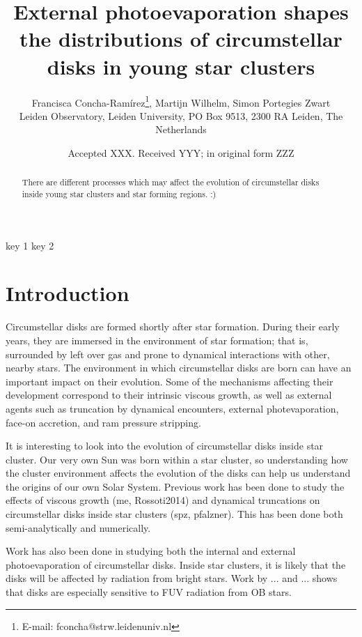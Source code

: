 \documentclass[fleqn,usenatbib]{mnras}
\title[External photoevaporation of disks in young star clusters]{External photoevaporation shapes the distributions of circumstellar disks in young star clusters}
\author[Concha-Ramírez et al.]{
Francisca Concha-Ramírez\thanks{E-mail: fconcha@strw.leidenuniv.nl},
Martijn Wilhelm,
Simon Portegies Zwart
\\
Leiden Observatory, Leiden University, PO Box 9513, 2300 RA Leiden, The Netherlands\\
}
\date{Accepted XXX. Received YYY; in original form ZZZ}
\begin{document}
\label{firstpage}
\pagerange{\pageref{firstpage}--\pageref{lastpage}}
\maketitle

\begin{abstract}
There are different processes which may affect the evolution of circumstellar disks inside young star clusters and star forming regions. :)
\end{abstract}

\begin{keywords}
key 1 key 2
\end{keywords}

\section{Introduction}
\label{sec:introduction}

Circumstellar disks are formed shortly after star formation. During their early years, they are immersed in the environment of star formation; that is, surrounded by left over gas and prone to dynamical interactions with other, nearby stars. 
The environment in which circumstellar disks are born can have an important impact on their evolution. Some of the mechanisms affecting their development correspond to their intrinsic viscous growth, as well as external agents such as truncation by dynamical encounters, external photevaporation, face-on accretion, and ram pressure stripping. 

It is interesting to look into the evolution of circumstellar disks inside star cluster. Our very own Sun was born within a star cluster, so understanding how the cluster environment affects the evolution of the disks can help us understand the origins of our own Solar System. Previous work has been done to study the effects of viscous growth (me, Rossoti2014) and dynamical truncations on circumstellar disks inside star clusters (spz, pfalzner). This has been done both semi-analytically and numerically. 

Work has also been done in studying both the internal and external photoevaporation of circumstellar disks. Inside star clusters, it is likely that the disks will be affected by radiation from bright stars. Work by ... and ... shows that disks are especially sensitive to FUV radiation from OB stars.
\end{document}
